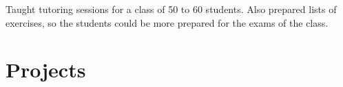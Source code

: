 \documentclass[]{deedy-resume-openfont}
\begin{document}
\begin{minipage}[t]{0.66\textwidth}
\begin{tightemize}
\item Taught tutoring sessions for a class of 50 to 60 students. Also prepared lists of exercises, so the students could be more prepared for the exams of the class.
\end{tightemize}







\section{Projects}


\end{minipage}
\end{document}

